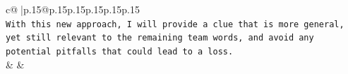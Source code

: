 \documentclass{article}
\begin{document}
{\begin{supertabular}{c@{$\;$}|p{.15\linewidth}@{}p{.15\linewidth}p{.15\linewidth}p{.15\linewidth}p{.15\linewidth}p{.15\linewidth}}
{{{\\ 
\texttt{With this new approach, I will provide a clue that is more general, yet still relevant to the remaining team words, and avoid any potential pitfalls that could lead to a loss.} \\
            }
        }
    }
    & & \\ \\

\end{supertabular}
}
\end{document}
